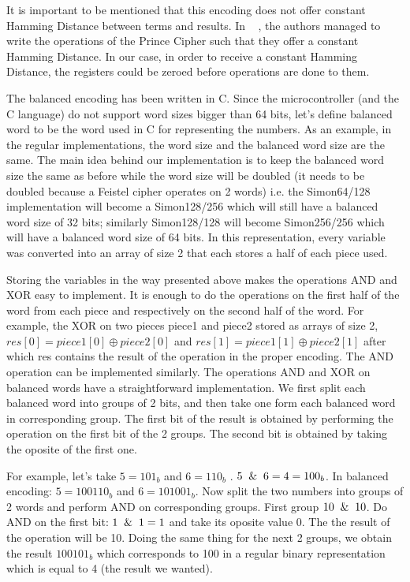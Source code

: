 \documentclass[conference]{IEEEtran}
\begin{document}
It is important to be mentioned that this encoding does not offer constant Hamming Distance between terms and results. In ~\cite{BEPrince} , the authors managed to write the operations of the Prince Cipher such that they offer a constant Hamming Distance. In our case, in order to receive a constant Hamming Distance, the registers could be zeroed before operations are done to them.

The balanced encoding has been written in C. Since the microcontroller (and the C language) do not support word sizes bigger than 64 bits, let's define balanced word to be the word used in C for representing the numbers. As an example, in the regular implementations, the word size and the balanced word size are the same. The main idea behind our implementation is to keep the balanced word size the same as before while the word size will be doubled (it needs to be doubled because a Feistel cipher operates on 2 words) i.e. the Simon64/128 implementation will become a Simon128/256 which will still have a balanced word size of 32 bits; similarly Simon128/128 will become Simon256/256 which will have a balanced word size of 64 bits. In this representation, every variable was converted into an array of size 2 that each stores a half of each piece used.   

Storing the variables in the way presented above makes the operations AND and XOR easy to implement. It is enough to do the operations on the first half of the word from each piece and respectively on the second half of the word. For example, the XOR on two pieces piece1 and piece2 stored as arrays of size 2, $res[0] = piece1[0] \oplus piece2[0]$ and $res[1] = piece1[1] \oplus piece2[1]$ after which res contains the result of the operation in the proper encoding. The AND operation can be implemented similarly. The operations AND and XOR on balanced words have a straightforward implementation. We first split each balanced word into groups of 2 bits, and then take one form each balanced word in corresponding group. The first bit of the result is obtained by performing the operation on the first bit of the 2 groups. The second bit is obtained by taking the oposite of the first one.

For example, let's take $5 = 101_{b}$ and $6 = 110_{b}$ . $5 \And 6 = 4 = 100_{b}$. In balanced encoding: $5 = 100110_{b}$ and $6 = 101001_{b}$. Now split the two numbers into groups of 2 words and perform AND on corresponding groups. First group $10 \And 10$. Do AND on the first bit: $1 \And 1 = 1$ and take its oposite value 0. The the result of the operation will be 10. Doing the same thing for the next 2 groups, we obtain the result $100101_{b}$ which corresponds to 100 in a regular binary representation which is equal to 4 (the result we wanted). 
\end{document}
